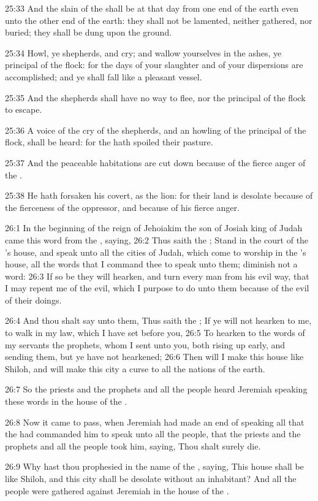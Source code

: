 25:33 And the slain of the \LORD shall be at that day from one end of
the earth even unto the other end of the earth: they shall not be
lamented, neither gathered, nor buried; they shall be dung upon the
ground.

25:34 Howl, ye shepherds, and cry; and wallow yourselves in the ashes,
ye principal of the flock: for the days of your slaughter and of your
dispersions are accomplished; and ye shall fall like a pleasant
vessel.

25:35 And the shepherds shall have no way to flee, nor the principal
of the flock to escape.

25:36 A voice of the cry of the shepherds, and an howling of the
principal of the flock, shall be heard: for the \LORD hath spoiled
their pasture.

25:37 And the peaceable habitations are cut down because of the fierce
anger of the \LORD.

25:38 He hath forsaken his covert, as the lion: for their land is
desolate because of the fierceness of the oppressor, and because of
his fierce anger.

26:1 In the beginning of the reign of Jehoiakim the son of Josiah king
of Judah came this word from the \LORD, saying, 26:2 Thus saith the
\LORD; Stand in the court of the \LORD's house, and speak unto all the
cities of Judah, which come to worship in the \LORD's house, all the
words that I command thee to speak unto them; diminish not a word:
26:3 If so be they will hearken, and turn every man from his evil way,
that I may repent me of the evil, which I purpose to do unto them
because of the evil of their doings.

26:4 And thou shalt say unto them, Thus saith the \LORD; If ye will not
hearken to me, to walk in my law, which I have set before you, 26:5 To
hearken to the words of my servants the prophets, whom I sent unto
you, both rising up early, and sending them, but ye have not
hearkened; 26:6 Then will I make this house like Shiloh, and will make
this city a curse to all the nations of the earth.

26:7 So the priests and the prophets and all the people heard Jeremiah
speaking these words in the house of the \LORD.

26:8 Now it came to pass, when Jeremiah had made an end of speaking
all that the \LORD had commanded him to speak unto all the people, that
the priests and the prophets and all the people took him, saying, Thou
shalt surely die.

26:9 Why hast thou prophesied in the name of the \LORD, saying, This
house shall be like Shiloh, and this city shall be desolate without an
inhabitant?  And all the people were gathered against Jeremiah in the
house of the \LORD.


